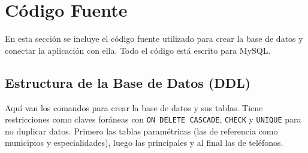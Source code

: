 \documentclass[12pt,a4paper]{article}
\begin{document}
\newpage
\section{C\'odigo Fuente}

En esta secci\'on se incluye el c\'odigo fuente utilizado para crear la base de datos y conectar la aplicaci\'on con ella. Todo el c\'odigo est\'a escrito para MySQL.

\subsection{Estructura de la Base de Datos (DDL)}

Aqu\'i van los comandos para crear la base de datos y sus tablas. Tiene restricciones como claves for\'aneas con \texttt{ON DELETE CASCADE}, \texttt{CHECK} y \texttt{UNIQUE} para no duplicar datos. Primero las tablas param\'etricas (las de referencia como municipios y especialidades), luego las principales y al final las de tel\'efonos.
\end{document}
